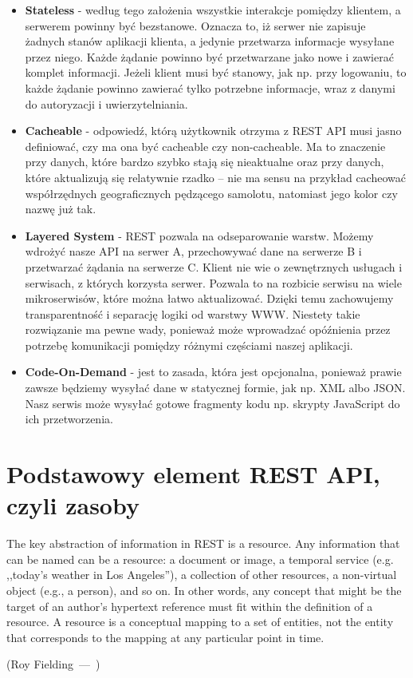 \documentclass[oneside,polski,logo,indent]{amuthesis}
\let\oldquote\quote
\let\endoldquote\endquote
\renewenvironment{quote}[2][]
  {\if\relax\detokenize{#1}\relax
     \def\quoteauthor{#2}%
   \else
     \def\quoteauthor{#2~---~#1}%
   \fi
   \oldquote}
  {\par\nobreak\smallskip\hfill(\quoteauthor)%
   \endoldquote\addvspace{\bigskipamount}}
\begin{document}
\begin{itemize}
\item \textbf{Stateless} - według tego założenia wszystkie interakcje pomiędzy klientem, a serwerem powinny być bezstanowe. Oznacza to, iż serwer nie zapisuje żadnych stanów aplikacji klienta, a jedynie przetwarza informacje wysyłane przez niego. Każde żądanie powinno być przetwarzane jako nowe i zawierać komplet informacji. Jeżeli klient musi być stanowy, jak np. przy logowaniu, to każde żądanie powinno zawierać tylko potrzebne informacje, wraz z danymi do autoryzacji i uwierzytelniania.\newline 
\item \textbf{Cacheable} - odpowiedź, którą użytkownik otrzyma z REST API musi jasno definiować, czy ma ona być cacheable czy non-cacheable. Ma to znaczenie przy danych, które bardzo szybko stają się nieaktualne oraz przy danych, które aktualizują się relatywnie rzadko – nie ma sensu na przykład cacheować współrzędnych geograficznych pędzącego samolotu, natomiast jego kolor czy nazwę już tak.\newline
\item \textbf{Layered System} - REST pozwala na odseparowanie warstw. Możemy wdrożyć nasze API na serwer A, przechowywać dane na serwerze B i przetwarzać żądania na serwerze C. Klient nie wie o zewnętrznych usługach i serwisach, z których korzysta serwer. Pozwala to na rozbicie serwisu na wiele mikroserwisów, które można łatwo aktualizować. Dzięki temu zachowujemy transparentność i separację logiki od warstwy WWW. Niestety takie rozwiązanie ma pewne wady, ponieważ może wprowadzać opóźnienia przez potrzebę komunikacji pomiędzy różnymi częściami naszej aplikacji.\newline
\item \textbf{Code-On-Demand} - jest to zasada, która jest opcjonalna, ponieważ prawie zawsze będziemy wysyłać dane w statycznej formie, jak np. XML albo JSON. Nasz serwis może wysyłać gotowe fragmenty kodu np. skrypty JavaScript do ich przetworzenia. 
\end{itemize}

\section{Podstawowy element REST API, czyli zasoby}

\begin{quote}{Roy Fielding}
The key abstraction of information in REST is a resource. Any information that can be named can be a resource: a document or image, a temporal service (e.g. ,,today’s weather in Los Angeles''), a collection of other resources, a non-virtual object (e.g., a person), and so on. In other words, any concept that might be the target of an author’s hypertext reference must fit within the definition of a resource. A resource is a conceptual mapping to a set of entities, not the entity that corresponds to the mapping at any particular point in time.
\end{quote}
\end{document}
